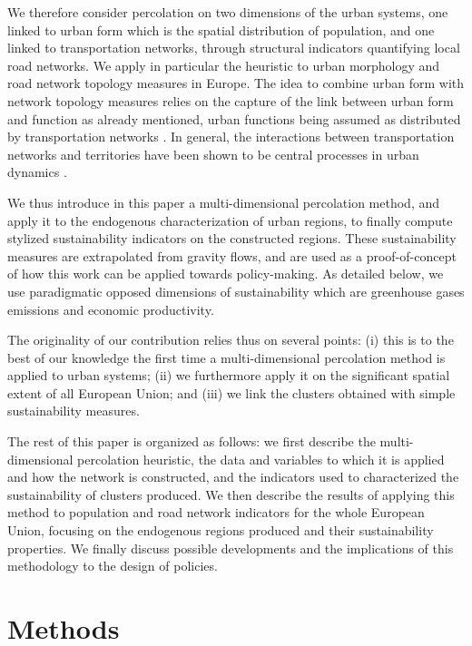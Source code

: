 \documentclass{jimis-en}
\begin{document}
We therefore consider percolation on two dimensions of the urban systems, one linked to urban form which is the spatial distribution of population, and one linked to transportation networks, through structural indicators quantifying local road networks. We apply in particular the heuristic to urban morphology and road network topology measures in Europe. The idea to combine urban form with network topology measures relies on the capture of the link between urban form and function as already mentioned, urban functions being assumed as distributed by transportation networks \citep{raimbault2018caracterisation}. In general, the interactions between transportation networks and territories have been shown to be central processes in urban dynamics \citep{espacegeo2014effets}.


We thus introduce in this paper a multi-dimensional percolation method, and apply it to the endogenous characterization of urban regions, to finally compute stylized sustainability indicators on the constructed regions. These sustainability measures are extrapolated from gravity flows, and are used as a proof-of-concept of how this work can be applied towards policy-making. As detailed below, we use paradigmatic opposed dimensions of sustainability which are greenhouse gases emissions and economic productivity.


The originality of our contribution relies thus on several points: (i) this is to the best of our knowledge the first time a multi-dimensional percolation method is applied to urban systems; (ii) we furthermore apply it on the significant spatial extent of all European Union; and (iii) we link the clusters obtained with simple sustainability measures.


The rest of this paper is organized as follows: we first describe the multi-dimensional percolation heuristic, the data and variables to which it is applied and how the network is constructed, and the indicators used to characterized the sustainability of clusters produced. We then describe the results of applying this method to population and road network indicators for the whole European Union, focusing on the endogenous regions produced and their sustainability properties. We finally discuss possible developments and the implications of this methodology to the design of policies.



\section{Methods}
\end{document}
